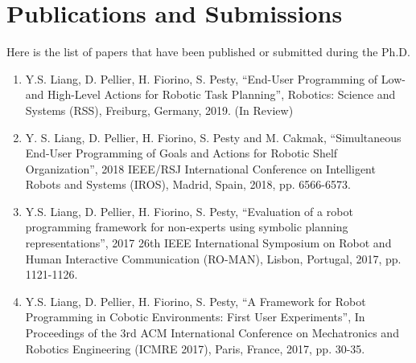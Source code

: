\chapter{Publications and Submissions}\label{app:publications}
Here is the list of papers that have been published or submitted during the Ph.D.

\begin{enumerate}
	\item Y.S. Liang, D. Pellier, H. Fiorino, S. Pesty, “End-User Programming of Low- and High-Level Actions for Robotic Task Planning”, Robotics: Science and Systems (RSS), Freiburg, Germany, 2019. (In Review)
	
	\item Y. S. Liang, D. Pellier, H. Fiorino, S. Pesty and M. Cakmak, “Simultaneous End-User Programming of Goals and Actions for Robotic Shelf Organization”, 2018 IEEE/RSJ International Conference on Intelligent Robots and Systems (IROS), Madrid, Spain, 2018, pp. 6566-6573.
	
	\item Y.S. Liang, D. Pellier, H. Fiorino, S. Pesty, “Evaluation of a robot programming framework for non-experts using symbolic planning representations”, 2017 26th IEEE International Symposium on Robot and Human Interactive Communication (RO-MAN), Lisbon, Portugal, 2017, pp. 1121-1126.
	
	\item Y.S. Liang, D. Pellier, H. Fiorino, S. Pesty, “A Framework for Robot Programming in Cobotic Environments: First User Experiments”, In Proceedings of the 3rd ACM International Conference on Mechatronics and Robotics Engineering (ICMRE 2017), Paris, France, 2017, pp. 30-35.
	
\end{enumerate}


